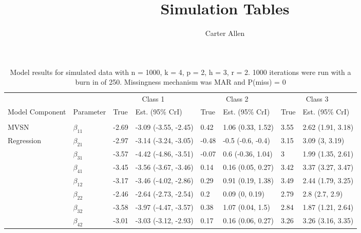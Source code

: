 \documentclass[]{article}
\title{Simulation Tables}
\author{Carter Allen}
\date{}
\begin{document}
\maketitle

\begin{table}[t]

\caption{\label{tab:unnamed-chunk-4}Model results for simulated data with n = 1000, k = 4, p = 2, h = 3, r = 2. 1000 iterations were run with a burn in of 250. Missingness mechanism was MAR and P(miss) = 0}
\centering
\fontsize{8}{10}\selectfont
\begin{tabular}{llllllll}
\toprule
\multicolumn{2}{c}{ } & \multicolumn{2}{c}{Class 1} & \multicolumn{2}{c}{Class 2} & \multicolumn{2}{c}{Class 3} \\
\cmidrule(l{3pt}r{3pt}){3-4} \cmidrule(l{3pt}r{3pt}){5-6} \cmidrule(l{3pt}r{3pt}){7-8}
Model Component & Parameter & True & Est. (95\% CrI) & True & Est. (95\% CrI) & True & Est. (95\% CrI)\\
\midrule
\addlinespace[0.3em]
\multicolumn{8}{l}{\textbf{ }}\\
\hspace{1em}MVSN & $\beta_{11}$ & -2.69 & -3.09 (-3.55, -2.45) & 0.42 & 1.06 (0.33, 1.52) & 3.55 & 2.62 (1.91, 3.18)\\
\hspace{1em}Regression & $\beta_{21}$ & -2.97 & -3.14 (-3.24, -3.05) & -0.48 & -0.5 (-0.6, -0.4) & 3.15 & 3.09 (3, 3.19)\\
\hspace{1em} & $\beta_{31}$ & -3.57 & -4.42 (-4.86, -3.51) & -0.07 & 0.6 (-0.36, 1.04) & 3 & 1.99 (1.35, 2.61)\\
\hspace{1em} & $\beta_{41}$ & -3.45 & -3.56 (-3.67, -3.46) & 0.14 & 0.16 (0.05, 0.27) & 3.42 & 3.37 (3.27, 3.47)\\
\hspace{1em} & $\beta_{12}$ & -3.17 & -3.46 (-4.02, -2.86) & 0.29 & 0.91 (0.19, 1.38) & 3.49 & 2.44 (1.79, 3.25)\\
\hspace{1em} & $\beta_{22}$ & -2.46 & -2.64 (-2.73, -2.54) & 0.2 & 0.09 (0, 0.19) & 2.79 & 2.8 (2.7, 2.9)\\
\hspace{1em} & $\beta_{32}$ & -3.58 & -3.97 (-4.47, -3.57) & 0.38 & 1.07 (0.04, 1.5) & 2.84 & 1.87 (1.21, 2.64)\\
\hspace{1em} & $\beta_{42}$ & -3.01 & -3.03 (-3.12, -2.93) & 0.17 & 0.16 (0.06, 0.27) & 3.26 & 3.26 (3.16, 3.35)\\

\end{tabular}
\end{table}
\end{document}
